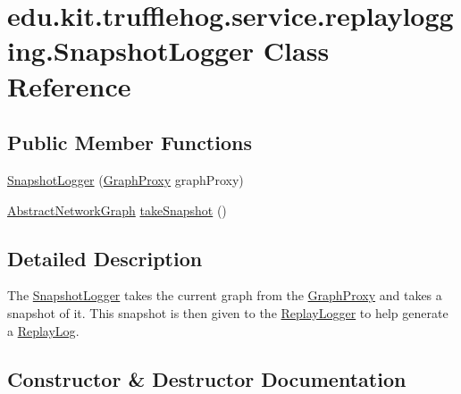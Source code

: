 \hypertarget{classedu_1_1kit_1_1trufflehog_1_1service_1_1replaylogging_1_1_snapshot_logger}{}\section{edu.\+kit.\+trufflehog.\+service.\+replaylogging.\+Snapshot\+Logger Class Reference}
\label{classedu_1_1kit_1_1trufflehog_1_1service_1_1replaylogging_1_1_snapshot_logger}
\subsection*{Public Member Functions}
\begin{DoxyCompactItemize}
\item 
\hyperlink{classedu_1_1kit_1_1trufflehog_1_1service_1_1replaylogging_1_1_snapshot_logger_a194eb36abde2eba0f44baa433171aa61}{Snapshot\+Logger} (\hyperlink{classedu_1_1kit_1_1trufflehog_1_1model_1_1graph_1_1_graph_proxy}{Graph\+Proxy} graph\+Proxy)
\item 
\hyperlink{classedu_1_1kit_1_1trufflehog_1_1model_1_1graph_1_1_abstract_network_graph}{Abstract\+Network\+Graph} \hyperlink{classedu_1_1kit_1_1trufflehog_1_1service_1_1replaylogging_1_1_snapshot_logger_a77bd10ba3572185ac0f9fba2b5bc0928}{take\+Snapshot} ()
\end{DoxyCompactItemize}


\subsection{Detailed Description}
The \hyperlink{classedu_1_1kit_1_1trufflehog_1_1service_1_1replaylogging_1_1_snapshot_logger}{Snapshot\+Logger} takes the current graph from the \hyperlink{}{Graph\+Proxy} and takes a snapshot of it. This snapshot is then given to the \hyperlink{classedu_1_1kit_1_1trufflehog_1_1service_1_1replaylogging_1_1_replay_logger}{Replay\+Logger} to help generate a \hyperlink{classedu_1_1kit_1_1trufflehog_1_1service_1_1replaylogging_1_1_replay_log}{Replay\+Log}. 

\subsection{Constructor \& Destructor Documentation}
\hypertarget{classedu_1_1kit_1_1trufflehog_1_1service_1_1replaylogging_1_1_snapshot_logger_a194eb36abde2eba0f44baa433171aa61}{}
